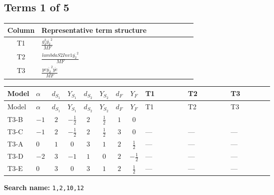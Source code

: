\documentclass[8pt]{article}
\begin{document}
\begin{landscape}
\subsection*{Terms 1 of 5}
\begin{center}
\begin{tabular}{@{}c >{\raggedright\arraybackslash}p{0.82\linewidth}@{}}
\toprule
Column & Representative term structure \\
\midrule
T1 & \(\displaystyle \frac{g_{2}^{2} \overline{y_{2}}^{2}}{MF}\) \\
\midrule
T2 & \(\displaystyle \frac{lambdaS2Inv1 \overline{y_{2}}^{2}}{MF}\) \\
\midrule
T3 & \(\displaystyle \frac{ye \overline{y_{2}}^{2} \overline{ye}}{MF}\) \\
\midrule
\bottomrule
\end{tabular}
\end{center}
\smallskip
\tiny
\begin{longtable}{@{}llcccccc >{\raggedright\arraybackslash}p{0.21\linewidth} >{\raggedright\arraybackslash}p{0.21\linewidth} >{\raggedright\arraybackslash}p{0.21\linewidth}@{}}
\toprule
Model & $\alpha$ & $d_{S_1}$ & $Y_{S_1}$ & $d_{S_2}$ & $Y_{S_2}$ & $d_F$ & $Y_F$ & T1 & T2 & T3 \\
\midrule
\endfirsthead
\toprule
Model & $\alpha$ & $d_{S_1}$ & $Y_{S_1}$ & $d_{S_2}$ & $Y_{S_2}$ & $d_F$ & $Y_F$ & T1 & T2 & T3 \\
\midrule
\endhead
T3-B & $-1$ & $2$ & $-\frac{1}{2}$ & $2$ & $\frac{1}{2}$ & $1$ & $0$ & \scriptsize\adjustbox{max width=\linewidth}{$\begin{gathered} - \frac{3 g_{2}^{2} \overline{y_{2}}^{2}}{8 MF}\end{gathered}$} & \scriptsize\adjustbox{max width=\linewidth}{$\begin{gathered} - \frac{lambdaS2Inv1 \overline{y_{2}}^{2}}{4 MF}\end{gathered}$} & \scriptsize\adjustbox{max width=\linewidth}{$\begin{gathered} \frac{ye \overline{y_{2}}^{2} \overline{ye}}{8 MF}\end{gathered}$} \\
\midrule
T3-C & $-1$ & $2$ & $-\frac{1}{2}$ & $2$ & $\frac{1}{2}$ & $3$ & $0$ & --- & --- & --- \\
\midrule
T3-A & $0$ & $1$ & $0$ & $3$ & $1$ & $2$ & $\frac{1}{2}$ & --- & --- & --- \\
\midrule
T3-D & $-2$ & $3$ & $-1$ & $1$ & $0$ & $2$ & $-\frac{1}{2}$ & --- & --- & --- \\
\midrule
T3-E & $0$ & $3$ & $0$ & $3$ & $1$ & $2$ & $\frac{1}{2}$ & --- & --- & --- \\
\midrule
\bottomrule
\end{longtable}
\clearpage
\noindent\textbf{Search name: }\texttt{1,2,10,12}\par\smallskip

\end{landscape}
\end{document}
